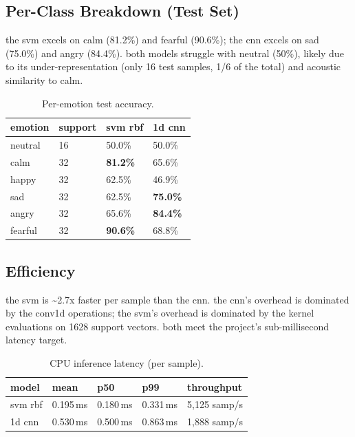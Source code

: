 \documentclass[conference]{IEEEtran}
\begin{document}
{\subsection{Per-Class Breakdown (Test Set)}\label{per-class-breakdown-test-set}

the svm excels on calm (81.2\%) and fearful (90.6\%); the cnn excels on
sad (75.0\%) and angry (84.4\%). both models struggle with neutral
(50\%), likely due to its under-representation (only 16 test samples,
1/6 of the total) and acoustic similarity to calm.

\begin{table}[H]
\centering
\caption{Per-emotion test accuracy.}
\label{tab:per-emotion-accuracy}
\begin{tabular}{@{}llll@{}}
\toprule
emotion & support & svm rbf & 1d cnn \\
\midrule
neutral & 16 & 50.0\% & 50.0\% \\
calm    & 32 & \textbf{81.2\%} & 65.6\% \\
happy   & 32 & 62.5\% & 46.9\% \\
sad     & 32 & 62.5\% & \textbf{75.0\%} \\
angry   & 32 & 65.6\% & \textbf{84.4\%} \\
fearful & 32 & \textbf{90.6\%} & 68.8\% \\
\bottomrule
\end{tabular}
\end{table}
\subsection{Efficiency}\label{efficiency}

the svm is \textasciitilde2.7x faster per sample than the cnn. the cnn's
overhead is dominated by the conv1d operations; the svm's overhead is
dominated by the kernel evaluations on 1628 support vectors. both meet
the project's sub-millisecond latency target.

\begin{table}[H]
\centering
\caption{CPU inference latency (per sample).}
\label{tab:latency}
\begin{tabular}{@{}lllll@{}}
\toprule
model & mean & p50 & p99 & throughput \\
\midrule
svm rbf & 0.195\,ms & 0.180\,ms & 0.331\,ms & 5,125 samp/s \\
1d cnn  & 0.530\,ms & 0.500\,ms & 0.863\,ms & 1,888 samp/s \\
\bottomrule
\end{tabular}
\end{table}


}
\end{document}
